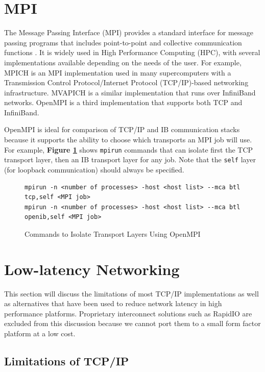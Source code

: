 \documentclass[11pt]{book}
\begin{document}
\section{\textbf{MPI}}

The Message Passing Interface (MPI) provides a standard interface for message
passing programs that includes point-to-point and collective communication
functions \cite{mpi-12}. It is widely used in High Performance Computing (HPC),
with several implementations available depending on the needs of the user. For
example, MPICH \cite{mpich} is an MPI implementation used in many supercomputers
with a Transmission Control Protocol/Internet Protocol (TCP/IP)-based networking
infrastructure. MVAPICH \cite{mvapich} is a similar implementation that runs
over InfiniBand networks. OpenMPI \cite{openmpi} is a third implementation that
supports both TCP and InfiniBand.

OpenMPI is ideal for comparison of TCP/IP and IB communication stacks because it
supports the ability to choose which transports an MPI job will use. For
example, \textbf{Figure \ref{ompi-btl}} shows \verb;mpirun; commands that can
isolate first the TCP transport layer, then an IB transport layer for any
job. Note that the \verb;self; layer (for loopback communication) should always
be specified.

\begin{figure}
\centering
\begin{verbatim}
mpirun -n <number of processes> -host <host list> --mca btl tcp,self <MPI job>
mpirun -n <number of processes> -host <host list> --mca btl openib,self <MPI job>
\end{verbatim}
\caption{Commands to Isolate Transport Layers Using OpenMPI}
\label{ompi-btl}
\end{figure}

\section{\textbf{Low-latency Networking}}

This section will discuss the limitations of most TCP/IP implementations as well
as alternatives that have been used to reduce network latency in high
performance platforms. Proprietary interconnect solutions such as
RapidIO are excluded from this discussion because we cannot port them to a
small form factor platform at a low cost.

\subsection{\textbf{Limitations of TCP/IP}}
\end{document}
